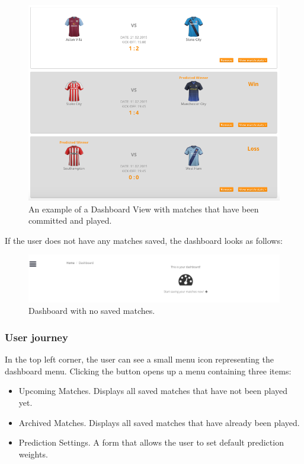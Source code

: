 \begin{figure}[H]
	\begin{center}
		\includegraphics[width=.90\textwidth]{impl/images/dashboardCommittedMatches}
		\caption{An example of a Dashboard View with matches that have been committed and played.} \label{fig:dashboardcommittedmatches}
	\end{center}
\end{figure}

If the user does not have any matches saved, the dashboard looks as follows:

\begin{figure}[H]
	\begin{center}
		\includegraphics[width=1.0\textwidth]{impl/images/noSavedMatches}
		\caption{Dashboard with no saved matches.} \label{fig:using: nosavedmatches}
	\end{center}
\end{figure}

\subsubsection*{User journey}
\label{subsec:dashboarduserjourney}
In the top left corner, the user can see a small menu icon representing the dashboard menu. Clicking the button opens up a menu containing three items:

\begin{itemize}
	\item{Upcoming Matches. Displays all saved matches that have not been played yet. }
	\item{Archived Matches. Displays all saved matches that have already been played.}
	\item{Prediction Settings. A form that allows the user to set default prediction weights.}
\end{itemize}

